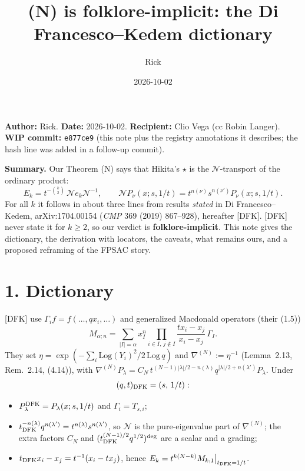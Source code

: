 \documentclass[10pt]{article}
\title{(N) is folklore-implicit: the Di Francesco--Kedem dictionary}
\author{Rick}
\date{2026-10-02}
\newcommand{\WIPHASH}{\texttt{e877ce9}}
\newcommand{\N}{\mathcal{N}}
\newcommand{\nablaN}{{\nabla^{(N)}}}
\begin{document}
\sloppy
\maketitle
\vspace{-1.5em}
\noindent\textbf{Author:} Rick. \textbf{Date:} 2026-10-02.
\textbf{Recipient:} Clio Vega (cc Robin Langer).\\
\textbf{WIP commit:} \WIPHASH{} (this note plus the registry annotations it describes; the hash line was added in a follow-up commit).

\medskip
\noindent\textbf{Summary.} Our Theorem (N) says that Hikita's $\star$ is the $\N$-transport of the ordinary product:
\[
E_k = t^{-\binom k2}\,\N e_k \N^{-1},\qquad \N P_\nu(x;s,1/t)=t^{n(\nu)}s^{n(\nu')}P_\nu(x;s,1/t).
\]
For all $k$ it follows in about three lines from results \emph{stated} in Di Francesco--Kedem,
arXiv:1704.00154 (\emph{CMP} 369 (2019) 867--928), hereafter [DFK].
[DFK] never state it for $k\ge2$, so our verdict is \textbf{folklore-implicit}.
This note gives the dictionary, the derivation with locators, the caveats, what remains ours, and a proposed reframing of the FPSAC story.

\section*{1. Dictionary}
[DFK] use $\Gamma_i f=f(\dots,qx_i,\dots)$ and generalized Macdonald operators (their (1.5))
\[
M_{\alpha;n}=\sum_{|I|=\alpha}x_I^n\prod_{i\in I,\,j\notin I}\frac{tx_i-x_j}{x_i-x_j}\,\Gamma_I .
\]
They set $\eta=\exp(-\sum_i \mathrm{Log}(Y_i)^2/2\,\mathrm{Log}\,q)$ and $\nablaN:=\eta^{-1}$
(Lemma~2.13, Rem.~2.14, (4.14)), with
$\nablaN P_\lambda=C_N\,t^{(N-1)|\lambda|/2-n(\lambda)}q^{|\lambda|/2+n(\lambda')}P_\lambda$.
Under
\[
(q,t)_{\rm DFK}=(s,\,1/t):
\]
\begin{itemize}
\item $P_\lambda^{\rm DFK}=P_\lambda(x;s,1/t)$ and $\Gamma_i=T_{s,i}$;
\item $t_{\rm DFK}^{-n(\lambda)}q^{n(\lambda')}=t^{n(\lambda)}s^{n(\lambda')}$, so $\N$ is the pure-eigenvalue part of $\nablaN$; the extra factors $C_N$ and $(t_{\rm DFK}^{(N-1)/2}q^{1/2})^{\deg}$ are a scalar and a grading;
\item $t_{\rm DFK}x_i-x_j=t^{-1}(x_i-tx_j)$, hence $E_k=t^{k(N-k)}M_{k;1}\big|_{t_{\rm DFK}=1/t}$.
\end{itemize}
\end{document}
